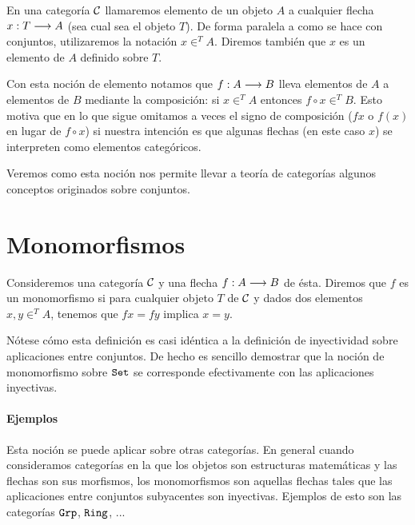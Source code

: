 \begin{definition}
En una categoría $\mathcal{C}$ llamaremos elemento de un objeto $A$
a cualquier flecha $x : T\longrightarrow A$ (sea cual sea el objeto
$T$). De forma paralela a como se hace con conjuntos, utilizaremos
la notación $x \in^T A$. Diremos también que $x$ es un elemento
de $A$ definido sobre $T$.
\end{definition}

Con esta noción de elemento notamos que $f : A\longrightarrow B$ lleva
elementos de $A$ a elementos de $B$ mediante la composición: si
$x \in^T A$ entonces $f \circ x \in^T B$. Esto motiva que en lo que
sigue omitamos a veces el signo de composición ($f x$
o $f(x)$ en lugar
de $f \circ x$) si nuestra intención es
que algunas flechas (en este caso $x$) se interpreten
como elementos categóricos.

Veremos como esta noción nos permite llevar a teoría de categorías
algunos conceptos originados sobre conjuntos.

\section{Monomorfismos}
\begin{definition}
Consideremos una categoría $\mathcal{C}$ y una flecha $f : A\longrightarrow B$ de ésta.
Diremos que $f$ es un monomorfismo si para cualquier objeto
$T$ de $\mathcal{C}$ y dados dos elementos
$x, y \in^T A$, tenemos que $fx = fy$ implica $x = y$.
\end{definition}

Nótese cómo esta definición es casi idéntica a la definición de
inyectividad sobre aplicaciones entre conjuntos. De hecho es sencillo
demostrar que la noción de monomorfismo sobre $\texttt{Set}$ se corresponde
efectivamente con las aplicaciones inyectivas.


\paragraph{Ejemplos}
Esta noción se puede aplicar sobre otras categorías. En general
cuando consideramos categorías en la que los objetos son estructuras
matemáticas y las flechas son sus morfismos, los monomorfismos son
aquellas flechas tales que las aplicaciones entre conjuntos subyacentes
son inyectivas. Ejemplos de esto son las categorías
$\texttt{Grp}$, $\texttt{Ring}$, ...

